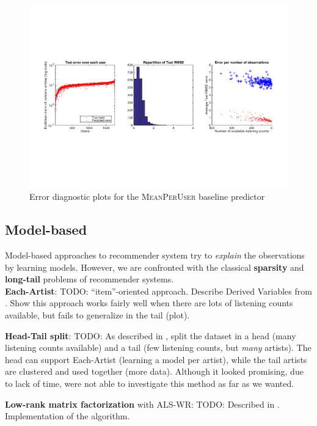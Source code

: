 \documentclass{article}
\begin{document}
  \begin{figure}[ht]
    \center
      \includegraphics[width=14cm]{figures/recommendation/baseline-predictor-plots.pdf}
    \caption{Error diagnostic plots for the \textsc{MeanPerUser} baseline predictor}
    \label{fig:baseline-predictor-plots}
  \end{figure}


  \subsection{Model-based}
  Model-based approaches to recommender system try to \textit{explain} the observations by learning models. However, we are confronted with the classical \textbf{sparsity} and \textbf{long-tail} problems of recommender systems.\\

    \noindent
    \textbf{Each-Artist}:
    TODO: ``item''-oriented approach. Describe Derived Variables from \cite{long-tail-recommender}. Show this approach works fairly well when there are lots of listening counts available, but fails to generalize in the tail (plot).

    \noindent
    \textbf{Head-Tail split}:
    TODO: As described in \cite{long-tail-recommender}, split the dataset in a head (many listening counts available) and a tail (few listening counts, but \textit{many} artists). The head can support Each-Artist (learning a model per artist), while the tail artists are clustered and used together (more data). Although it looked promising, due to lack of time, were not able to investigate this method as far as we wanted.

    \noindent
    \textbf{Low-rank matrix factorization} with ALS-WR:
    TODO: Described in \cite{alswr}. Implementation of the algorithm.
\end{document}
